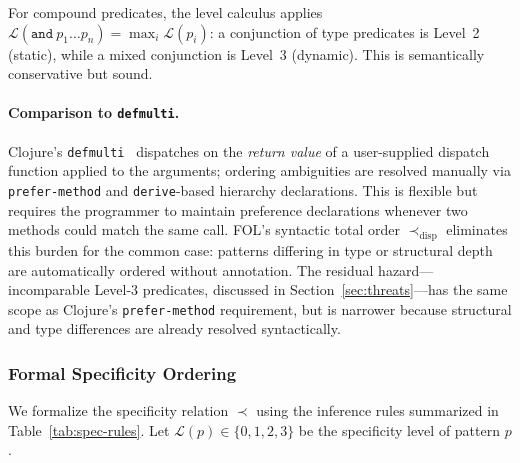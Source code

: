 \documentclass[sigconf,nonacm]{acmart}
\begin{document}
For compound predicates, the level calculus applies $\mathcal{L}(\texttt{and}~p_1 \dots p_n) = \max_i \mathcal{L}(p_i)$: a conjunction of type predicates is Level~2 (static), while a mixed conjunction is Level~3 (dynamic). This is semantically conservative but sound.

\paragraph{Comparison to \texttt{defmulti}.}
Clojure's \texttt{defmulti}~\cite{Hickey2008} dispatches on the \emph{return value} of a user-supplied dispatch function applied to the arguments; ordering ambiguities are resolved manually via \texttt{prefer-method} and \texttt{derive}-based hierarchy declarations. This is flexible but requires the programmer to maintain preference declarations whenever two methods could match the same call. FOL's syntactic total order $\prec_{\text{disp}}$ eliminates this burden for the common case: patterns differing in type or structural depth are automatically ordered without annotation. The residual hazard---incomparable Level-3 predicates, discussed in Section~\ref{sec:threats}---has the same scope as Clojure's \texttt{prefer-method} requirement, but is narrower because structural and type differences are already resolved syntactically.

\subsubsection{Formal Specificity Ordering}

We formalize the specificity relation $\prec$ using the inference rules summarized in Table~\ref{tab:spec-rules}. Let $\mathcal{L}(p) \in \{0, 1, 2, 3\}$ be the specificity level of pattern $p$.
\end{document}
